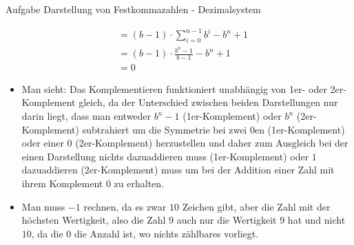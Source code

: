 \begin{frame}[allowframebreaks]{Aufgabe \thesection}{Darstellung von Festkommazahlen - Dezimalsystem}
\begin{solution}
\begin{itemize}
\begin{align*}
            &=(b-1)\cdot\sum_{i=0}^{n-1}b^{i}-b^{n}+1\\
            &=(b-1)\cdot\frac{b^{n}-1}{b-1}-b^{n}+1\\
            &=0
        \end{align*}
    \end{itemize}
  \end{solution}
  \begin{Sidenote}
    \begin{itemize}
        \item Man sieht: Das Komplementieren funktioniert unabhängig von 1er- oder 2er-Komplement gleich, da der Unterschied zwischen beiden Darstellungen nur darin liegt, dass man entweder $b^n-1$ (1er-Komplement) oder $b^n$ (2er-Komplement) subtrahiert um die Symmetrie bei zwei 0en (1er-Komplement) oder einer 0 (2er-Komplement) herzustellen und daher zum Ausgleich bei der einen Darstellung nichts dazuaddieren muss (1er-Komplement) oder $1$ dazuaddieren (2er-Komplement) muss um bei der Addition einer Zahl mit ihrem Komplement $0$ zu erhalten. 
        \item Man muss $-1$ rechnen, da es zwar $10$ Zeichen gibt, aber die Zahl mit der höchsten Wertigkeit, also die Zahl $9$ auch nur die Wertigkeit $9$ hat und nicht $10$, da die $0$ die Anzahl ist, wo nichts zählbares vorliegt.
    \end{itemize}
  \end{Sidenote}
\end{frame}
